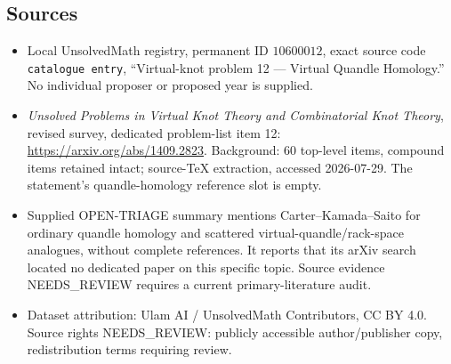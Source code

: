 \documentclass[11pt]{article}
\begin{document}
\subsection{Sources}
\begin{itemize}
\item Local UnsolvedMath registry, permanent ID \(10600012\), exact source code \texttt{catalogue entry}, ``Virtual-knot problem 12 --- Virtual Quandle Homology.'' No individual proposer or proposed year is supplied.
\item \emph{Unsolved Problems in Virtual Knot Theory and Combinatorial Knot Theory}, revised survey, dedicated problem-list item 12: \url{https://arxiv.org/abs/1409.2823}. Background: 60 top-level items, compound items retained intact; source-TeX extraction, accessed 2026-07-29. The statement's quandle-homology reference slot is empty.
\item Supplied OPEN-TRIAGE summary mentions Carter--Kamada--Saito for ordinary quandle homology and scattered virtual-quandle/rack-space analogues, without complete references. It reports that its arXiv search located no dedicated paper on this specific topic. Source evidence NEEDS\_REVIEW requires a current primary-literature audit.
\item Dataset attribution: Ulam AI / UnsolvedMath Contributors, CC BY 4.0. Source rights NEEDS\_REVIEW: publicly accessible author/publisher copy, redistribution terms requiring review.
\end{itemize}
\end{document}
